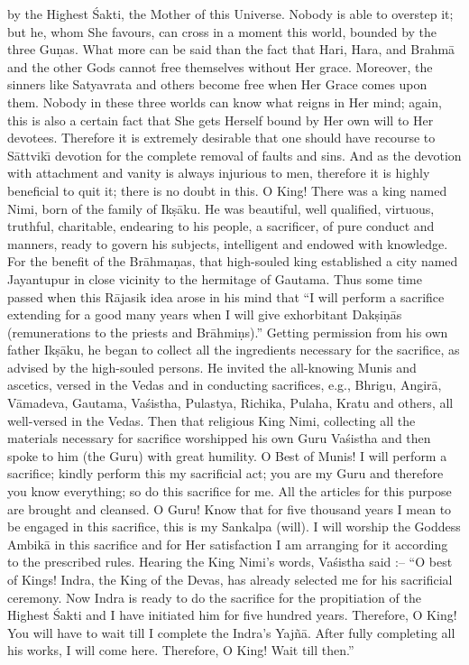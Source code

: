 by the Highest \'Sakti, the Mother of this Universe. Nobody is able to overstep it; but he, whom She favours, can cross in a moment this world, bounded by the three Gu\d{n}as. What more can be said than the fact that Hari, Hara, and Brahm\=a and the other Gods cannot free themselves without Her grace. Moreover, the sinners like Satyavrata and others become free when Her Grace comes upon them. Nobody in these three worlds can know what reigns in Her mind; again, this is also a certain fact that She gets Herself bound by Her own will to Her devotees. Therefore it is extremely desirable that one should have recourse to S\=attvik\={\i} devotion for the complete removal of faults and sins. And as the devotion with attachment and vanity is always injurious to men, therefore it is highly beneficial to quit it; there is no doubt in this. O King! There was a king named Nimi, born of the family of Ik\d{s}\=aku. He was beautiful, well qualified, virtuous, truthful, charitable, endearing to his people, a sacrificer, of pure conduct and manners, ready to govern his subjects, intelligent and endowed with knowledge. For the benefit of the Br\=ahma\d{n}as, that high-souled king established a city named Jayantupur in close vicinity to the hermitage of Gautama. Thus some time passed when this R\=ajasik idea arose in his mind that ``I will perform a sacrifice extending for a good many years when I will give exhorbitant Dak\d{s}i\d{n}\=as (remunerations to the priests and Br\=ahmi\d{n}s).'' Getting permission from his own father Ik\d{s}\=aku, he began to collect all the ingredients necessary for the sacrifice, as advised by the high-souled persons. He invited the all-knowing Munis and ascetics, versed in the Vedas and in conducting sacrifices, e.g., Bhrigu, Angir\=a, V\=amadeva, Gautama, Va\'sistha, Pulastya, Richika, Pulaha, Kratu and others, all well-versed in the Vedas. Then that religious King Nimi, collecting all the materials necessary for sacrifice worshipped his own Guru Va\'sistha and then spoke to him (the Guru) with great humility. O Best of Munis! I will perform a sacrifice; kindly perform this my sacrificial act; you are my Guru and therefore you know everything; so do this sacrifice for me. All the articles for this purpose are brought and cleansed. O Guru! Know that for five thousand years I mean to be engaged in this sacrifice, this is my Sankalpa (will). I will worship the Goddess Ambik\=a in this sacrifice and for Her satisfaction I am arranging for it according to the prescribed rules. Hearing the King Nimi's words, Va\'sistha said :-- ``O best of Kings! Indra, the King of the Devas, has already selected me for his sacrificial ceremony. Now Indra is ready to do the sacrifice for the propitiation of the Highest \'Sakti and I have initiated him for five hundred years. Therefore, O King! You will have to wait till I complete the Indra's Yaj\~n\=a. After fully completing all his works, I will come here. Therefore, O King! Wait till then.''

